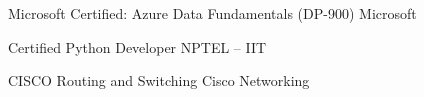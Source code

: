 
\begin{cvhonors}

  \cvhonor
    {Microsoft Certified: Azure Data Fundamentals (DP-900)}
    {Microsoft}
    {}
    {}

  \cvhonor
    {Certified Python Developer}
    {NPTEL – IIT}
    {}
    {}

  \cvhonor
    {CISCO Routing and Switching}
    {Cisco Networking}
    {}
    {}

\end{cvhonors}
